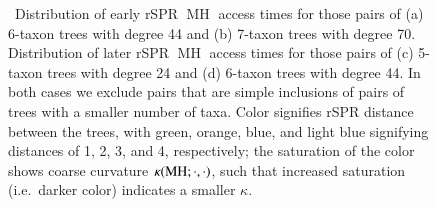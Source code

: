 \documentclass[]{elsarticle}
\let\MYoriglatexcaption\caption
\renewcommand{\caption}[2][\relax]{\MYoriglatexcaption[#2]{#2}}
\newcommand{\MH}{\operatorname{MH}}
\newcommand{\curvature}[2][]{%
    \ifthenelse{\equal{#1}{}}%
		{\kappa(#2)}%
		{\kappa_{#1}(#2)}%
}
\begin{document}
\begin{figure}
    \caption{\
        Distribution of early rSPR $\MH$ access times for those pairs of (a) 6-taxon trees with degree 44 and (b) 7-taxon trees with degree 70.
        Distribution of later rSPR $\MH$ access times for those pairs of (c) 5-taxon trees with degree 24 and (d) 6-taxon trees with degree 44.
				In both cases we exclude pairs that are simple inclusions of pairs of trees with a smaller number of taxa.
        Color signifies rSPR distance between the trees, with green, orange, blue, and light blue signifying distances of 1, 2, 3, and 4, respectively; the saturation of the color shows coarse curvature $\curvature{\MH; \cdot, \cdot}$, such that increased saturation (i.e.\ darker color) indicates a smaller $\kappa$.
        }
	\label{fig:kappa-access}
\end{figure}
\end{document}
